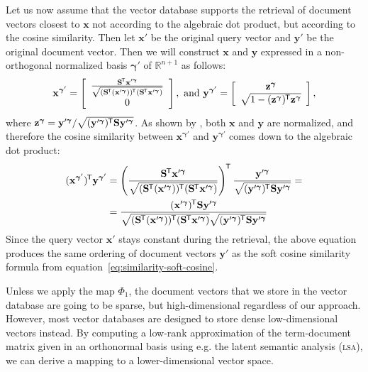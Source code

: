 \documentclass[
  digital, %
  notable, %
  lof,     %
  lot,     %
  nopalatino, color
]{fithesis3}
\def\abbr#1{\textsc{\MakeLowercase{#1}}}
\newcommand*{\tran}{^{\mkern-1.5mu\mathsf{T}}}
\begin{document}
Let us now assume that the vector database supports the retrieval of document
vectors closest to $\mathbf x$ not according to the algebraic dot product, but
according to the cosine similarity. Then let $\mathbf
x'$ be the original query vector and $\mathbf y'$ be the original document
vector. Then we will construct $\mathbf x$ and $\mathbf y$ expressed in a
non-orthogonal normalized basis $\bm\gamma'$ of
$\mathbb{R}^{n+1}$ as follows:
\begin{equation*}
  \mathbf x^{\bm\gamma'} = \left[\begin{array}{c}\frac{\mathbf S\tran\mathbf x'^{\bm\gamma}}{\sqrt{(\mathbf S\tran(\mathbf x'^{\bm\gamma}))\tran(\mathbf S\tran\mathbf x'^{\bm\gamma})}} \\ 0\end{array}\right],\text{ and }
  \mathbf y^{\bm\gamma'} = \left[\begin{array}{c}\mathbf z^{\bm\gamma} \\ \sqrt{1-(\mathbf z^{\bm\gamma})\tran\mathbf z^{\bm\gamma}}\end{array}\right],
\end{equation*}
where $\mathbf z^{\bm\gamma} = \mathbf y'^{\bm\gamma} / \sqrt{(\mathbf y'^{\bm\gamma})\tran\mathbf S\mathbf y'^{\bm\gamma}}$.
As shown by \textcite[sec.~4.3]{neyshabur2015symmetric}, both $\mathbf x$ and
$\mathbf y$ are normalized, and therefore the cosine similarity between $\mathbf x^{\bm\gamma'}$ and $\mathbf y^{\bm\gamma'}$ comes
down to the algebraic dot product:
\begin{align*}
  (\mathbf x^{\bm\gamma'})\tran\mathbf y^{\bm\gamma'}
  &= \left(\frac{\mathbf S\tran\mathbf x'^{\bm\gamma}}{\sqrt{(\mathbf S\tran(\mathbf x'^{\bm\gamma}))\tran(\mathbf S\tran\mathbf x'^{\bm\gamma})}}\right)\tran
  \frac{\mathbf y'^{\bm\gamma}}{\sqrt{(\mathbf y'^{\bm\gamma})\tran\mathbf S\mathbf y'^{\bm\gamma}}} = \\
  &= \frac{(\mathbf x'^{\bm\gamma})\tran\mathbf S\mathbf y'^{\bm\gamma}}{\sqrt{(\mathbf S\tran(\mathbf x'^{\bm\gamma}))\tran(\mathbf S\tran\mathbf x'^{\bm\gamma})}\sqrt{(\mathbf y'^{\bm\gamma})\tran\mathbf S\mathbf y'^{\bm\gamma}}}
\end{align*}
Since the query vector $\mathbf x'$ stays constant during the retrieval, the above
equation produces the same ordering of document vectors $\mathbf y'$ as the soft
cosine similarity formula from equation~\ref{eq:similarity-soft-cosine}.

Unless we apply the map $\Phi_1$, the document vectors that we
store in the vector database are going to be sparse, but high-dimensional
regardless of our approach. However, most vector databases are designed to
store dense low-dimensional vectors instead. By computing a low-rank
approximation of the term-document matrix given in an orthonormal basis using
e.g.  the latent semantic analysis (\abbr{LSA})\index{LSA@\abbr{LSA}}, we can
derive a mapping to a lower-dimensional vector space.
\end{document}
